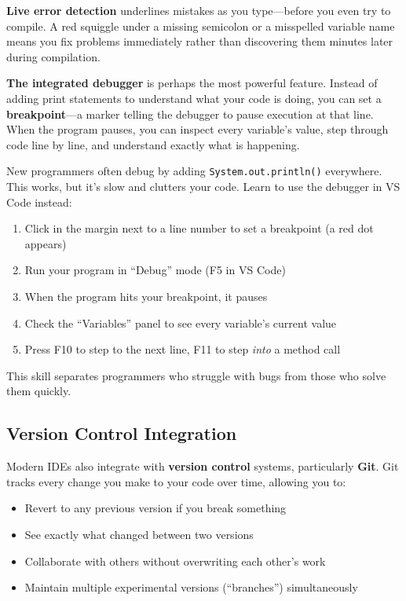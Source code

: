 \documentclass[11pt,letterpaper]{article}
\newcommand{\keyterm}[1]{\textbf{\textcolor{cssecondary}{#1}}}
\begin{document}
\textbf{Live error detection} underlines mistakes as you type---before you even try to compile. A red squiggle under a missing semicolon or a misspelled variable name means you fix problems immediately rather than discovering them minutes later during compilation.

\textbf{The integrated debugger} is perhaps the most powerful feature. Instead of adding print statements to understand what your code is doing, you can set a \keyterm{breakpoint}---a marker telling the debugger to pause execution at that line. When the program pauses, you can inspect every variable's value, step through code line by line, and understand exactly what is happening.

\begin{tipbox}
New programmers often debug by adding \texttt{System.out.println()} everywhere. This works, but it's slow and clutters your code. Learn to use the debugger in VS Code instead:
\begin{enumerate}[itemsep=2pt]
    \item Click in the margin next to a line number to set a breakpoint (a red dot appears)
    \item Run your program in ``Debug'' mode (F5 in VS Code)
    \item When the program hits your breakpoint, it pauses
    \item Check the ``Variables'' panel to see every variable's current value
    \item Press F10 to step to the next line, F11 to step \textit{into} a method call
\end{enumerate}
This skill separates programmers who struggle with bugs from those who solve them quickly.
\end{tipbox}

\subsection{Version Control Integration}

Modern IDEs also integrate with \keyterm{version control} systems, particularly \keyterm{Git}. Git tracks every change you make to your code over time, allowing you to:

\begin{itemize}[itemsep=3pt]
    \item Revert to any previous version if you break something
    \item See exactly what changed between two versions
    \item Collaborate with others without overwriting each other's work
    \item Maintain multiple experimental versions (``branches'') simultaneously
\end{itemize}
\end{document}
